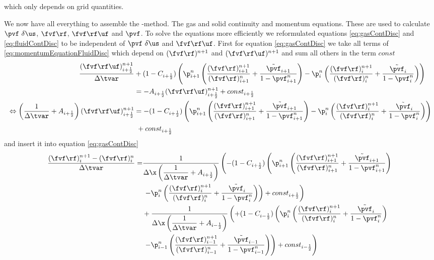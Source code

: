 which only depends on grid quantities.

We now have all everything to assemble the \MP-method. The gas and solid continuity and momentum equations. 
These are used to calculate $\pvf \ \delta \us$, $\fvf \rf $, $\fvf \rf \uf$ and $\pvf$.
To solve the equations more efficiently we reformulated equations \eqref{eq:gasContDisc} and \eqref{eq:fluidContDisc} to be independent of $\pvf \ \delta \us$ and $\fvf \rf \uf$. 
\color{ForestGreen}
First for equation \eqref{eq:gasContDisc} we take all terms of \eqref{eq:momentumEquationFluidDisc} which depend on $(\fvf \rf)^{n+1}$ and $(\fvf \rf \uf)^{n+1}$ and sum all others in the term $const$
\begin{align*}
    \dfrac{(\fvf \rf \uf)_{i+\frac{1}{2}}^{n+1}}{\Delta \tvar} &+ (1 - C_{i+\frac{1}{2}})  \left( \p_{i+1}^n \left( \dfrac{(\fvf \rf)_{i+1}^{n+1}}{(\fvf \rf)_{i+1}^n} + \dfrac{\tilde{\pvf}_{i+1}}{1 - \pvf_{i+1}^n}\right) 
    - \p_{i}^n \left(\dfrac{(\fvf \rf)_{i}^{n+1}}{(\fvf \rf)_{i}^n} + \dfrac{\tilde{\pvf}_{i}}{1 - \pvf_{i}^n} \right)\right) \\
    &= - A_{i+\frac{1}{2}} (\fvf \rf \uf)_{i+\frac{1}{2}}^{n+1} + const_{i+\frac{1}{2}} \\
    \Leftrightarrow
    \left(\dfrac{1}{\Delta \tvar} + A_{i+\frac{1}{2}} \right) (\fvf \rf \uf)_{i+\frac{1}{2}}^{n+1} &= - (1 - C_{i+\frac{1}{2}}) \left( \p_{i+1}^n \left( \dfrac{(\fvf \rf)_{i+1}^{n+1}}{(\fvf \rf)_{i+1}^n} + \dfrac{\tilde{\pvf}_{i+1}}{1 - \pvf_{i+1}^n}\right) 
    - \p_{i}^n \left(\dfrac{(\fvf \rf)_{i}^{n+1}}{(\fvf \rf)_{i}^n} + \dfrac{\tilde{\pvf}_{i}}{1 - \pvf_{i}^n} \right)\right)  \\
    & \ + const_{i+\frac{1}{2}}
\end{align*}
and insert it into equation \eqref{eq:gasContDisc}
\begin{align*}
     \dfrac{(\fvf \rf)_i^{n+1} - (\fvf \rf)_i^n}{\Delta \tvar}
    = 
    & \dfrac{1}{\Delta \x \left(\dfrac{1}{\Delta \tvar} + A_{i+\frac{1}{2}} \right)}\left( - (1 - C_{i+\frac{1}{2}}) \left( \p_{i+1}^n \left( \dfrac{(\fvf \rf)_{i+1}^{n+1}}{(\fvf \rf)_{i+1}^n} + \dfrac{\tilde{\pvf}_{i+1}}{1 - \pvf_{i+1}^n}\right) 
    \right. \right.
    \\ & \left. \left.- \p_{i}^n \left(\dfrac{(\fvf \rf)_{i}^{n+1}}{(\fvf \rf)_{i}^n} + \dfrac{\tilde{\pvf}_{i}}{1 - \pvf_{i}^n} \right)\right) + const_{i+\frac{1}{2}} \right)
    \\
    & + \dfrac{1}{\Delta \x \left(\dfrac{1}{\Delta \tvar} + A_{i-\frac{1}{2}} \right)}\left( + (1 - C_{i-\frac{1}{2}}) \left( \p_i^n \left( \dfrac{(\fvf \rf)_i^{n+1}}{(\fvf \rf)_i^n} + \dfrac{\tilde{\pvf}_i}{1 - \pvf_i^n}\right) 
    \right. \right. \\
   & \left. \left.  - \p_{i-1}^n \left(\dfrac{(\fvf \rf)_{i-1}^{n+1}}{(\fvf \rf)_{i-1}^n} + \dfrac{\tilde{\pvf}_{i-1}}{1- \pvf_{i-1}^n} \right)\right) + const_{i-\frac{1}{2}} \right)
\end{align*}

